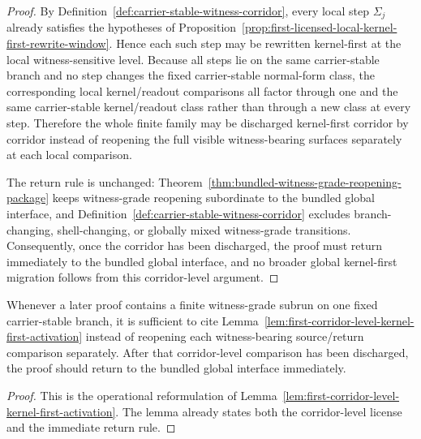\begin{proof}
By Definition~\ref{def:carrier-stable-witness-corridor}, every local step $\Sigma_j$ already satisfies the hypotheses of Proposition~\ref{prop:first-licensed-local-kernel-first-rewrite-window}. Hence each such step may be rewritten kernel-first at the local witness-sensitive level. Because all steps lie on the same carrier-stable branch and no step changes the fixed carrier-stable normal-form class, the corresponding local kernel/readout comparisons all factor through one and the same carrier-stable kernel/readout class rather than through a new class at every step. Therefore the whole finite family may be discharged kernel-first corridor by corridor instead of reopening the full visible witness-bearing surfaces separately at each local comparison.

The return rule is unchanged: Theorem~\ref{thm:bundled-witness-grade-reopening-package} keeps witness-grade reopening subordinate to the bundled global interface, and Definition~\ref{def:carrier-stable-witness-corridor} excludes branch-changing, shell-changing, or globally mixed witness-grade transitions. Consequently, once the corridor has been discharged, the proof must return immediately to the bundled global interface, and no broader global kernel-first migration follows from this corridor-level argument.
\end{proof}

\begin{corollary}
\label{cor:use-rule-for-the-first-corridor-level-activation-lemma}
Whenever a later proof contains a finite witness-grade subrun on one fixed carrier-stable branch, it is sufficient to cite Lemma~\ref{lem:first-corridor-level-kernel-first-activation} instead of reopening each witness-bearing source/return comparison separately. After that corridor-level comparison has been discharged, the proof should return to the bundled global interface immediately.
\end{corollary}

\begin{proof}
This is the operational reformulation of Lemma~\ref{lem:first-corridor-level-kernel-first-activation}. The lemma already states both the corridor-level license and the immediate return rule.
\end{proof}




